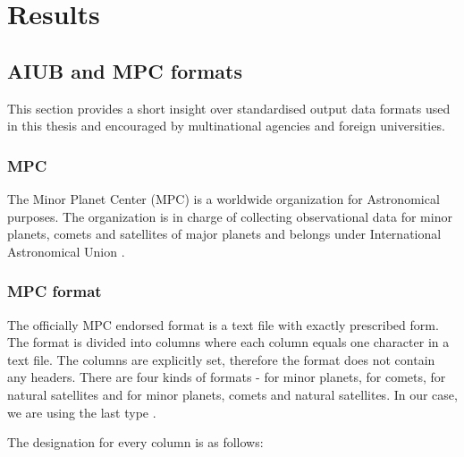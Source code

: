 \chapter{Results}\label{chap:results}

\section{AIUB and MPC formats}\label{sec:tdm_ccsds}

	This section provides a short insight over standardised output data formats used in this thesis and encouraged by multinational agencies and foreign universities. 
		
\subsection{MPC}\label{sec:mpc}

	The Minor Planet Center (MPC) is a worldwide organization for Astronomical purposes. The organization is in charge of collecting observational data for minor planets, comets and satellites of major planets and belongs under International Astronomical Union \citep{mpc}.
	
\subsection{MPC format}

	The officially MPC endorsed format is a text file with exactly prescribed form. The format is divided into columns where each column equals one character in a text file. The columns are explicitly set, therefore the format does not contain any headers. There are four kinds of formats - for minor planets, for comets, for natural satellites and for minor planets, comets and natural satellites. In our case, we are using the last type \citep{mpc}.
	
	The designation for every column is as follows:
	
